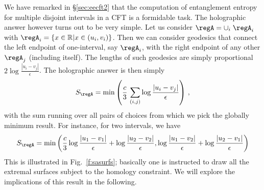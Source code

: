 \documentclass[12pt,openany]{book}
\begin{document}
We have remarked in \S\ref{sec:eecft2} that the computation of entanglement entropy for multiple disjoint intervals in a CFT is a formidable task. The holographic answer however turns out to be very simple.  Let us consider $\regA = \cup_i \;  \regA_i$ with
$\regA_i = \{x\in {\mathbb R} | x \in (u_i,v_i)\}$. Then we can consider geodesics that connect the left endpoint of one-interval, say $\regA_i$, with the right endpoint of any other $\regA_j$ (including itself). The lengths of such geodesics are simply proportional
$2 \log \frac{|u_i - v_j|}{\epsilon} $. The holographic answer is then simply
%
\begin{equation}
S_\regA = \min \left(\frac{c}{3} \, \sum_{(i,j)} \log \frac{|u_i - v_j|}{\epsilon} \right) \,,
\label{eq:holkcft2}
\end{equation}
%
with the sum running over all pairs of choices from which we pick the globally minimum result. For instance, for two intervals, we have
%
\begin{equation}
S_\regA = \min \left(\frac{c}{3} \log \frac{|u_1 - v_1|}{\epsilon}  + \log \frac{|u_2 - v_2|}{\epsilon} ,
\log \frac{|u_1 - v_2|}{\epsilon} +\log \frac{|u_2 - v_1|}{\epsilon} \right)
\label{eq:hol2cft2}
\end{equation}
%
This is illustrated in Fig.~\ref{f:sasurfs};  basically one is instructed to draw  all the extremal surfaces subject to the homology constraint. We will explore the  implications of this result in the following.
\end{document}
